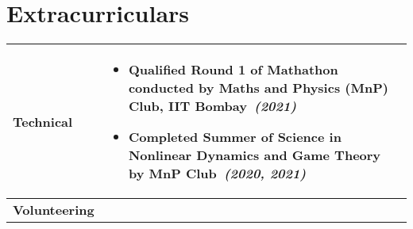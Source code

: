 \documentclass[10pt,a4paper,sans]{moderncv}        %
\newcommand{\rhs}[1]{\hfill{\small{\textsl{(#1)}}}}
\newcommand{\rhsmall}[1]{\hfill{\footnotesize{\textsl{(#1)}}}}
\begin{document}
\section{Extracurriculars}
\begin{tabular}{p{0.99in}p{6.01in}}
\vspace{-0.5em}
\small\textbf{Technical} & %
\vspace{-0.5em}
\begin{itemize}
	\item Qualified Round 1 of \textbf{Mathathon} conducted by Maths and Physics (MnP) Club, IIT Bombay\ \rhsmall{2021}
	\item Completed Summer of Science in \textbf{Nonlinear Dynamics} and \textbf{Game Theory} by MnP Club\ \rhsmall{2020, 2021}
\end{itemize}\\[-1em]\hline
\vspace{-0.5em}
\small\textbf{Volunteering} & \vspace{-0.5em}
\begin{itemize}

\end{itemize}
\end{tabular}
\end{document}
